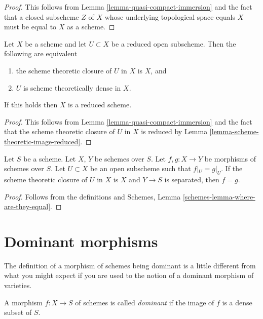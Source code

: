 \begin{proof}
This follows from
Lemma \ref{lemma-quasi-compact-immersion}
and the fact that a closed subscheme $Z$ of $X$ whose
underlying topological space equals $X$ must be equal to $X$
as a scheme.
\end{proof}

\begin{lemma}
\label{lemma-reduced-subscheme-closure}
Let $X$ be a scheme and let $U \subset X$ be a reduced open subscheme.
Then the following are equivalent
\begin{enumerate}
\item the scheme theoretic closure of $U$ in $X$ is $X$, and
\item $U$ is scheme theoretically dense in $X$.
\end{enumerate}
If this holds then $X$ is a reduced scheme.
\end{lemma}

\begin{proof}
This follows from
Lemma \ref{lemma-quasi-compact-immersion}
and the fact that the scheme theoretic closure of $U$ in $X$ is
reduced by
Lemma \ref{lemma-scheme-theoretic-image-reduced}.
\end{proof}


\begin{lemma}
\label{lemma-equality-of-morphisms}
Let $S$ be a scheme. Let $X$, $Y$ be schemes over $S$.
Let $f, g : X \to Y$ be morphisms of schemes over $S$.
Let $U \subset X$ be an open subscheme such that
$f|_U = g|_U$. If the scheme theoretic closure of $U$
in $X$ is $X$ and $Y \to S$ is separated, then $f = g$.
\end{lemma}

\begin{proof}
Follows from the definitions and
Schemes, Lemma \ref{schemes-lemma-where-are-they-equal}.
\end{proof}




\section{Dominant morphisms}
\label{section-dominant}

\noindent
The definition of a morphism of schemes being dominant is a little
different from what you might expect if you are used to the notion
of a dominant morphism of varieties.

\begin{definition}
\label{definition-dominant}
A morphism $f : X \to S$ of schemes is called {\it dominant} if the
image of $f$ is a dense subset of $S$.
\end{definition}

